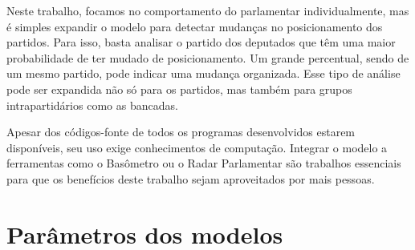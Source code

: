 \documentclass[a4paper,titlepage]{ppgi}\usepackage[]{graphicx}\usepackage[]{color}
\begin{document}
Neste trabalho, focamos no comportamento do parlamentar individualmente, mas é
simples expandir o modelo para detectar mudanças no posicionamento dos
partidos. Para isso, basta analisar o partido dos deputados que têm uma maior
probabilidade de ter mudado de posicionamento. Um grande percentual, sendo
de um mesmo partido, pode indicar uma mudança organizada. Esse tipo de análise
pode ser expandida não só para os partidos, mas também para grupos
intrapartidários como as bancadas.

Apesar dos códigos-fonte de todos os programas desenvolvidos estarem
disponíveis, seu uso exige conhecimentos de computação. Integrar o modelo a
ferramentas como o Basômetro ou o Radar Parlamentar são trabalhos essenciais
para que os benefícios deste trabalho sejam aproveitados por mais pessoas.





\appendix


\chapter{Parâmetros dos modelos}
\label{apendice:parametros-modelos}
\end{document}
